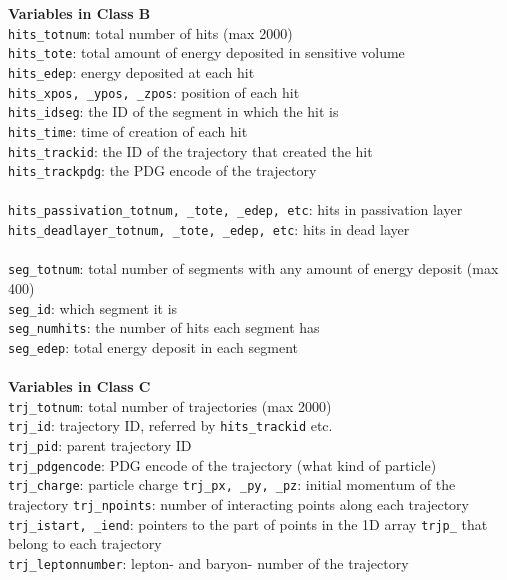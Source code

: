 {\bf Variables in Class B} \\
\nolinkurl{hits_totnum}: total number of hits (max 2000) \\
\nolinkurl{hits_tote}: total amount of energy deposited in sensitive volume \\
\nolinkurl{hits_edep}: energy deposited at each hit \\
\nolinkurl{hits_xpos, _ypos, _zpos}: position of each hit \\
\nolinkurl{hits_idseg}: the ID of the segment in which the hit is \\
\nolinkurl{hits_time}: time of creation of each hit \\
\nolinkurl{hits_trackid}: the ID of the trajectory that created the hit \\
\nolinkurl{hits_trackpdg}: the PDG encode of the trajectory \\
\\
\nolinkurl{hits_passivation_totnum, _tote, _edep, etc}: hits in passivation layer\\
\nolinkurl{hits_deadlayer_totnum, _tote, _edep, etc}: hits in dead layer\\
\\
\nolinkurl{seg_totnum}: total number of segments with 
any amount of energy deposit (max 400) \\
\nolinkurl{seg_id}: which segment it is \\
\nolinkurl{seg_numhits}: the number of hits each segment has \\
\nolinkurl{seg_edep}: total energy deposit in each segment \\
\\
{\bf Variables in Class C}\\
\nolinkurl{trj_totnum}: total number of trajectories (max 2000)\\
\nolinkurl{trj_id}: trajectory ID, referred by \nolinkurl{hits_trackid} etc. \\
\nolinkurl{trj_pid}: parent trajectory ID \\
\nolinkurl{trj_pdgencode}: PDG encode of the trajectory (what kind of particle) \\
\nolinkurl{trj_charge}: particle charge
\nolinkurl{trj_px, _py, _pz}: initial momentum of the trajectory
\nolinkurl{trj_npoints}: number of interacting points along each trajectory \\
\nolinkurl{trj_istart, _iend}: pointers to the part of points 
in the 1D array \nolinkurl{trjp_} that belong to each trajectory \\
\nolinkurl{trj_leptonnumber}: lepton- and baryon- number of the trajectory \\

